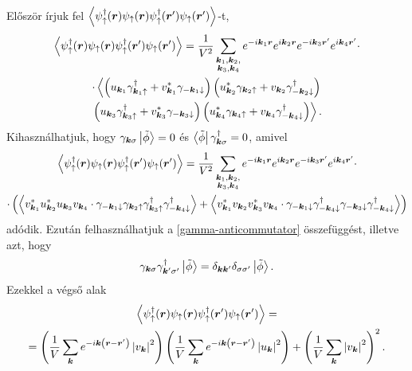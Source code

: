 \documentclass[a4paper,12pt,titlepage]{article}
\newcommand{\KK}{{\vb*{k}}}
\newcommand{\RR}{{\vb*{r}}}
\begin{document}
Először írjuk fel $\expval{\psi_\uparrow^\dagger(\RR) \psi_\uparrow(\RR) \psi_\uparrow^\dagger(\RR^\prime) \psi_\uparrow(\RR^\prime)}$-t,
\begin{multline}
	\expval{\psi_\uparrow^\dagger(\RR) \psi_\uparrow(\RR) \psi_\uparrow^\dagger(\RR^\prime) \psi_\uparrow(\RR^\prime)} = \frac{1}{V^2} \sum\limits_{\substack{\KK_1, \KK_2, \\ \KK_3, \KK_4}} e^{-i \KK_1 \RR} e^{i \KK_2 \RR} e^{-i \KK_3 \RR^\prime} e^{i \KK_4 \RR^\prime} \cdot \\
	\cdot \left< \left( u_{\KK_1} \gamma_{\KK_1 \uparrow}^\dagger + v_{\KK_1}^* \gamma_{-\KK_1 \downarrow} \right) \left( u_{\KK_2}^* \gamma_{\KK_2 \uparrow} + v_{\KK_2} \gamma_{-\KK_2 \downarrow}^\dagger \right)
	\right. \\ \left.
	\left( u_{\KK_3} \gamma_{\KK_3 \uparrow}^\dagger + v_{\KK_3}^* \gamma_{-\KK_3 \downarrow} \right) \left( u_{\KK_4}^* \gamma_{\KK_4 \uparrow} + v_{\KK_4} \gamma_{-\KK_4 \downarrow}^\dagger \right) \right>.
\end{multline}
Kihasználhatjuk, hogy $\gamma_{\KK \sigma} \ket{\tilde{\phi}} = 0$ és $\bra{\tilde{\phi}} \gamma_{\KK \sigma}^\dagger = 0$, amivel
\begin{multline}
	\expval{\psi_\uparrow^\dagger(\RR) \psi_\uparrow(\RR) \psi_\uparrow^\dagger(\RR^\prime) \psi_\uparrow(\RR^\prime)} = \frac{1}{V^2} \sum\limits_{\substack{\KK_1, \KK_2, \\ \KK_3, \KK_4}} e^{-i \KK_1 \RR} e^{i \KK_2 \RR} e^{-i \KK_3 \RR^\prime} e^{i \KK_4 \RR^\prime} \cdot \\
	\cdot \left( \expval{v_{\KK_1}^* u_{\KK_2}^* u_{\KK_3} v_{\KK_4} \cdot \gamma_{-\KK_1 \downarrow} \gamma_{\KK_2 \uparrow} \gamma_{\KK_3 \uparrow}^\dagger \gamma_{-\KK_4 \downarrow}^\dagger} + \expval{v_{\KK_1}^* v_{\KK_2} v_{\KK_3}^* v_{\KK_4} \cdot \gamma_{-\KK_1 \downarrow} \gamma_{-\KK_4 \downarrow}^\dagger \gamma_{-\KK_3 \downarrow} \gamma_{-\KK_4 \downarrow}^\dagger} \right)
\end{multline}
adódik.  Ezután felhasználhatjuk a \eqref{gamma-anticommutator} összefüggést, illetve azt, hogy
$$ \gamma_{\KK \sigma} \gamma_{\KK^\prime \sigma^\prime}^\dagger \ket{\tilde{\phi}} = \delta_{\KK \KK^\prime} \delta_{\sigma \sigma^\prime} \ket{\tilde{\phi}}. $$
Ezekkel a végső alak
\begin{multline}
	\expval{\psi_\uparrow^\dagger(\RR) \psi_\uparrow(\RR) \psi_\uparrow^\dagger(\RR^\prime) \psi_\uparrow(\RR^\prime)} = \\
	= \left( \frac{1}{V} \sum\limits_\KK e^{-i \KK \left( \RR - \RR^\prime \right)} \left| v_\KK \right|^2 \right) \left( \frac{1}{V} \sum\limits_\KK e^{-i \KK \left( \RR - \RR^\prime \right)} \left| u_\KK \right|^2 \right) + \left( \frac{1}{V} \sum\limits_\KK \left| v_\KK \right|^2 \right)^2.
\end{multline}
\end{document}

